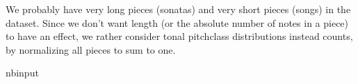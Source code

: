 \documentclass[letterpaper,10pt,english]{sphinxmanual}
\begin{document}
\sphinxAtStartPar
We probably have very long pieces (sonatas) and very short pieces (songs) in the dataset. Since we don’t want length (or the absolute number of notes in a piece) to have an effect, we rather consider tonal pitch\sphinxhyphen{}class distributions instead counts, by normalizing all pieces to sum to one.

\begin{sphinxuseclass}{nbinput}
{
\begin{sphinxVerbatim}[commandchars=\\\{\}]
\llap{\color{nbsphinxin}[12]:\,\hspace{\fboxrule}\hspace{\fboxsep}}   
\end{sphinxVerbatim}
}

\end{sphinxuseclass}
\end{document}
